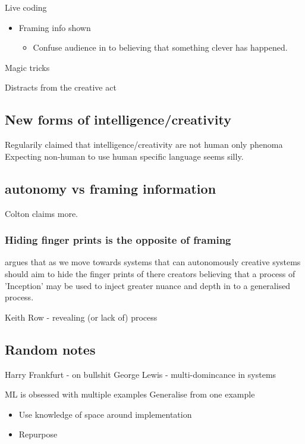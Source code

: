 \documentclass[11pt]{article}
\begin{document}
Live coding 
\begin{itemize}
\item Framing info shown
\begin{itemize}
\item Confuse audience in to believing that something clever has happened.
\end{itemize}
\end{itemize}

Magic tricks  

Distracts from the creative act

\subsection{New forms of intelligence/creativity}
\label{sec:orgeeff98e}
Regularily claimed that intelligence/creativity are not human only phenoma
Expecting non-human to use human specific language seems silly.

\subsection{autonomy vs framing information}
\label{sec:org6df2e97}
Colton claims more.

\subsubsection{Hiding finger prints is the opposite of framing}
\label{sec:org31a6bea}
\cite{Ventura2016} argues that as we move towards systems that can autonomously creative systems should aim to hide the finger prints of there creators believing that a process of 'Inception' may be used to inject greater nuance and depth in to a generalised process.

Keith Row - revealing (or lack of) process

\subsection{Random notes}
\label{sec:org36a3be5}

Harry Frankfurt - on bullshit
George Lewis - multi-domincance in systems

ML is obsessed with multiple examples
Generalise from one example
\begin{itemize}
\item Use knowledge of space around implementation
\item Repurpose
\end{itemize}
\end{document}

